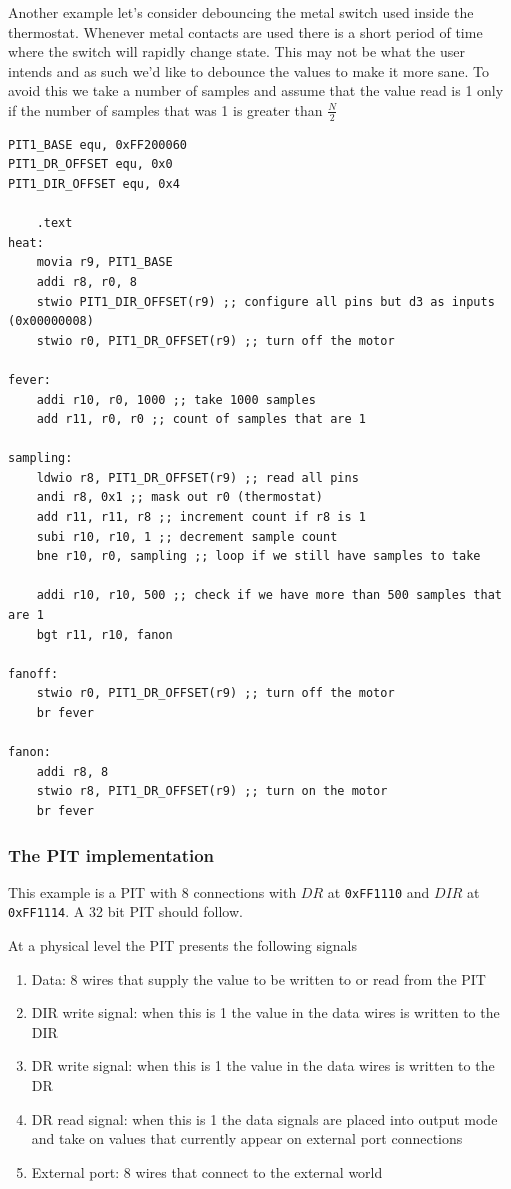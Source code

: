 \documentclass[../notes.tex]{subfiles}
\begin{document}
Another example let's consider debouncing the metal switch used inside the thermostat. Whenever metal contacts are used there is a short period of time where the switch will rapidly change state. This may not be what the user intends and as such we'd like to debounce the values to make it more sane.
To avoid this we take a number of samples and assume that the value read is 1 only if the number of samples that was 1 is greater than $ \frac{N}{2} $ 



\begin{listing}[H]
\begin{verbatim}
PIT1_BASE equ, 0xFF200060
PIT1_DR_OFFSET equ, 0x0
PIT1_DIR_OFFSET equ, 0x4

	.text
heat:
	movia r9, PIT1_BASE
	addi r8, r0, 8
	stwio PIT1_DIR_OFFSET(r9) ;; configure all pins but d3 as inputs (0x00000008)
	stwio r0, PIT1_DR_OFFSET(r9) ;; turn off the motor

fever:
	addi r10, r0, 1000 ;; take 1000 samples
	add r11, r0, r0 ;; count of samples that are 1

sampling:
	ldwio r8, PIT1_DR_OFFSET(r9) ;; read all pins
	andi r8, 0x1 ;; mask out r0 (thermostat)
	add r11, r11, r8 ;; increment count if r8 is 1
	subi r10, r10, 1 ;; decrement sample count
	bne r10, r0, sampling ;; loop if we still have samples to take

	addi r10, r10, 500 ;; check if we have more than 500 samples that are 1
	bgt r11, r10, fanon

fanoff:
	stwio r0, PIT1_DR_OFFSET(r9) ;; turn off the motor
	br fever

fanon:
	addi r8, 8
	stwio r8, PIT1_DR_OFFSET(r9) ;; turn on the motor
	br fever
\end{verbatim}
\end{listing}


\subsubsection{The PIT implementation}

This example is a PIT with 8 connections with $ DR $ at \texttt{0xFF1110}  and $ DIR $ at \texttt{0xFF1114}. A 32 bit PIT should follow.


At a physical level the PIT presents the following signals


\begin{enumerate}
	\item Data: 8 wires that supply the value to be written to or read from the PIT
	\item DIR write signal: when this is 1 the value in the data wires is written to the DIR
	\item DR write signal: when this is 1 the value in the data wires is written to the DR
	\item DR read signal: when this is 1 the data signals are placed into output mode and take on values that currently appear on external port connections
	\item External port: 8 wires that connect to the external world
\end{enumerate}
\end{document}
